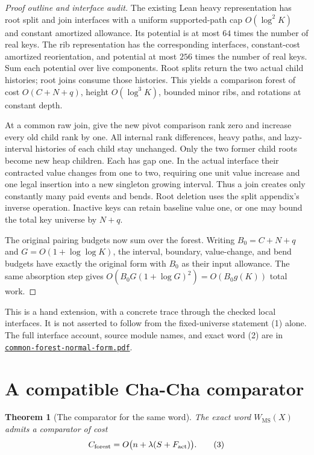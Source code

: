 \documentclass[11pt]{article}
\newtheorem{theorem}{Theorem}
\newcommand{\MS}{\operatorname{MS}}
\begin{document}
\begin{proof}[Proof outline and interface audit]
The existing Lean heavy representation has root split and join
interfaces with a uniform supported-path cap $O(\log^2 K)$ and
constant amortized allowance. Its potential is at most $64$ times
the number of real keys. The rib representation has the corresponding
interfaces, constant-cost amortized reorientation, and potential at
most $256$ times the number of real keys. Sum each potential over
live components. Root splits return the two actual child histories;
root joins consume those histories. This yields a comparison forest
of cost $O(C+N+q)$, height $O(\log^3 K)$, bounded minor ribs, and
rotations at constant depth.

At a common raw join, give the new pivot comparison rank zero and
increase every old child rank by one. All internal rank differences,
heavy paths, and lazy-interval histories of each child stay unchanged.
Only the two former child roots become new heap children. Each has
gap one. In the actual interface their contracted value changes from
one to two, requiring one unit value increase and one legal insertion
into a new singleton growing interval. Thus a join creates only
constantly many paid events and bends. Root deletion uses the split
appendix's inverse operation. Inactive keys can retain baseline value
one, or one may bound the total key universe by $N+q$.

The original pairing budgets now sum over the forest. Writing
$B_0=C+N+q$ and $G=O(1+\log\log K)$, the interval, boundary,
value-change, and bend budgets have exactly the original form with
$B_0$ as their input allowance. The same absorption step gives
$O(B_0G(1+\log G)^2)=O(B_0g(K))$ total work.
\end{proof}

This is a hand extension, with a concrete trace through the checked
local interfaces. It is not asserted to follow from the fixed-universe
statement (1) alone. The full interface account, source module names,
and exact word (2) are in
\href{common-forest-normal-form.pdf}{\texttt{common-forest-normal-form.pdf}}.

\section{A compatible Cha-Cha comparator}

\begin{theorem}[The comparator for the same word]\label{thm:comparator}
The exact word $W_{\MS}(X)$ admits a comparator of cost
\[
 C_{\rm forest}=O\bigl(n+\lambda(S+F_{\rm act})\bigr).
                                                               \tag{3}
\]
\end{theorem}
\end{document}
